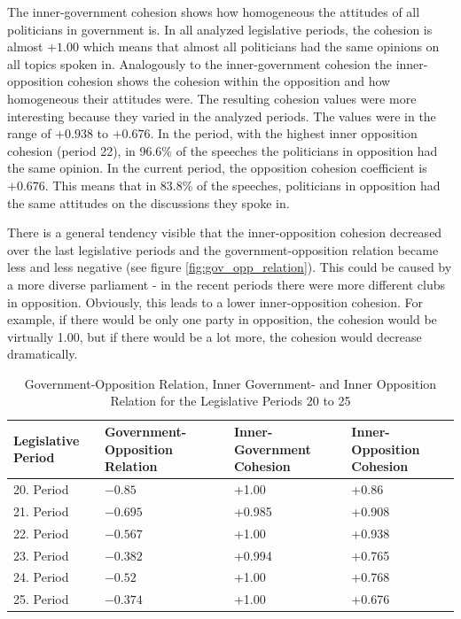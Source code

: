 The inner-government cohesion shows how homogeneous the attitudes of all politicians in government is. In all analyzed legislative periods, the cohesion is almost $+1.00$ which means that almost all politicians had the same opinions on all topics spoken in. Analogously to the inner-government cohesion the inner-opposition cohesion shows the cohesion within the opposition and how homogeneous their attitudes were. The resulting cohesion values were more interesting because they varied in the analyzed periods. The values were in the range of $+0.938$ to $+0.676$. In the period, with the highest inner opposition cohesion (period 22), in 96.6\% of the speeches the politicians in opposition had the same opinion. In the current period, the opposition cohesion coefficient is $+0.676$. This means that in 83.8\% of the speeches, politicians in opposition had the same attitudes on the discussions they spoke in.

There is a general tendency visible that the inner-opposition cohesion decreased over the last legislative periods and the government-opposition relation became less and less negative (see figure \ref{fig:gov_opp_relation}). This could be caused by a more diverse parliament - in the recent periods there were more different clubs in opposition. Obviously, this leads to a lower inner-opposition cohesion. For example, if there would be only one party in opposition, the cohesion would be virtually 1.00, but if there would be a lot more, the cohesion would decrease dramatically.

\begin{table}

\centering
\bgroup
\def\arraystretch{1.2}
\begin{tabular}{| p{2cm} | p{3cm} | p{3cm} | p{3cm} |}
\hline
  Legislative Period & Government-Opposition Relation & Inner-Government Cohesion & Inner-Opposition Cohesion \\
\hline
\hline
  20. Period & $-0.85$ & +1.00 & +0.86 \\
\hline
  21. Period & $-0.695$ & +0.985 & +0.908 \\
\hline
  22. Period & $-0.567$ & +1.00 & +0.938 \\
\hline
  23. Period & $-0.382$ & +0.994 & +0.765\\
\hline
  24. Period & $-0.52$ & +1.00 & +0.768\\
\hline
  25. Period & $-0.374$ & +1.00 & +0.676\\
\hline

\end{tabular}
\egroup
\caption{Government-Opposition Relation, Inner Government- and Inner Opposition Relation for the Legislative Periods 20 to 25}
\label{table:gov_opp_relation}
\end{table}


